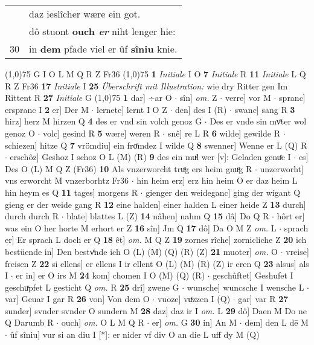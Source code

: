 \documentclass[8pt,a4paper,notitlepage]{article}
\begin{document}
\begin{table}[ht]
\begin{minipage}[t]{0.5\linewidth}
\begin{tabular}{rl}
 & daz ieslîcher wære ein got.\\ 
 & dô stuont \textbf{ouch \textit{er}} niht lenger hie:\\ 
30 & in \textbf{dem} pfade viel er ûf \textbf{sîniu} knie.\\ 
\end{tabular}
\scriptsize
\line(1,0){75} \newline
G I O L M Q R Z Fr36 \newline
\line(1,0){75} \newline
\textbf{1} \textit{Initiale} I O  \textbf{7} \textit{Initiale} R  \textbf{11} \textit{Initiale} L Q R Z Fr36  \textbf{17} \textit{Initiale} I  \textbf{25} \textit{Überschrift mit Illustration:} wie dry Ritter gen Im Rittent R  \textbf{27} \textit{Initiale} G  \newline
\line(1,0){75} \newline
\textbf{1} dar] ÷ar O  $\cdot$ sîn] \textit{om.} Z  $\cdot$ verre] vor M  $\cdot$ spranc] erspranc I \textbf{2} er] Der M  $\cdot$ lernete] lernt I O Z  $\cdot$ den] des I (R)  $\cdot$ swanc] sang R \textbf{3} hirz] herz M hirzen Q \textbf{4} des er vnd sin volch genoz G  $\cdot$ Des er vnde sin mvͦter wol genoz O  $\cdot$ volc] gesind R \textbf{5} wære] weren R  $\cdot$ snê] re L R \textbf{6} wilde] gewilde R  $\cdot$ schiezen] hitze Q \textbf{7} vrömdiu] ein froͤmdez I wilde Q \textbf{8} swenner] Wenne er L (Q) R  $\cdot$ erschôz] Geshoz I schoz O L (M) (R) \textbf{9} des ein muͤl wer [v]: Geladen genuͤc I  $\cdot$ es] Des O (L) M Q Z (Fr36) \textbf{10} Als vnzerworcht truͦg ers heim gnuͦg R  $\cdot$ unzerworht] vns erworcht M vnzerborhtz Fr36  $\cdot$ hin heim erz] erz hin heim O er daz heim L hin heym es Q \textbf{11} tages] morgens R  $\cdot$ gienger den weideganc] ging der wigant Q gieng er der weide gang R \textbf{12} eine halden] einer halden L einer heide Z \textbf{13} durch] durch durch R  $\cdot$ blate] blattes L (Z) \textbf{14} nâhen] nahm Q \textbf{15} dâ] Do Q R  $\cdot$ hôrt er] was ein O her horte M erhort er Z \textbf{16} sîn] Jm Q \textbf{17} dô] Da O M Z \textit{om.} L  $\cdot$ sprach er] Er sprach L doch er Q \textbf{18} êt] \textit{om.} M Q Z \textbf{19} zornes rîche] zornicliche Z \textbf{20} ich bestüende in] Den bestvͦnde ich O (L) (M) (Q) (R) (Z) \textbf{21} muoter] \textit{om.} O  $\cdot$ vreise] freisen Z \textbf{22} si ellens] er ellens I ir ellent O (L) (M) (R) (Z) ir eren Q \textbf{23} alsus] als I  $\cdot$ er in] er O irs M \textbf{24} kom] chomen I O (M) (Q) (R)  $\cdot$ geschûftet] Geshufet I geschuͯpfet L gesticht Q \textit{om.} R \textbf{25} drî] zwene G  $\cdot$ wunsche] wuncsche I wensche L  $\cdot$ var] Geuar I gar R \textbf{26} von] Von dem O  $\cdot$ vuoze] vuͤzzen I (Q)  $\cdot$ gar] var R \textbf{27} sunder] svnder svnder O sundern M \textbf{28} daz] daz ir I \textit{om.} L \textbf{29} dô] Daen M Do ne Q Darumb R  $\cdot$ ouch] \textit{om.} O L M Q R  $\cdot$ er] \textit{om.} G \textbf{30} in] An M  $\cdot$ dem] den L dē M  $\cdot$ ûf sîniu] vur si an diu I [*]: er nider vf div O an die L uff dy M (Q) \newline

\end{minipage}
\end{table}
\end{document}
